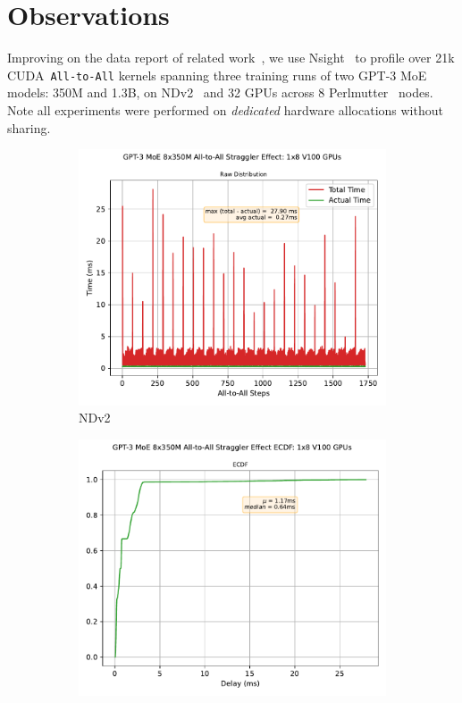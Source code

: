 
\section{Observations}\label{sec:observations}
Improving on the data report of related work~\cite{288705, 10.1145/3603269.3604869},
we use Nsight~\cite{nsys} to profile over 21k CUDA~\verb|All-to-All| kernels spanning three training runs of two
GPT-3 MoE models: 350M and 1.3B, on NDv2~\cite{azure} and 32 GPUs across 8 Perlmutter~\cite{perlm} nodes.
Note all experiments were performed on \emph{dedicated} hardware allocations without sharing.
\begin{figure}[!ht]
    \begin{subfigure}{.5\linewidth}
        \centering
        \includegraphics[width=0.8\linewidth]{images/GPT-3_MoE_8x350M}
        \caption{NDv2}
        \label{sub:s_350}
    \end{subfigure}\hfill %
    \begin{subfigure}{.5\linewidth}
        \centering
        \includegraphics[width=0.8\linewidth]{images/GPT-3_MoE_8x350M_ecdf}

\end{subfigure}
\end{figure}
